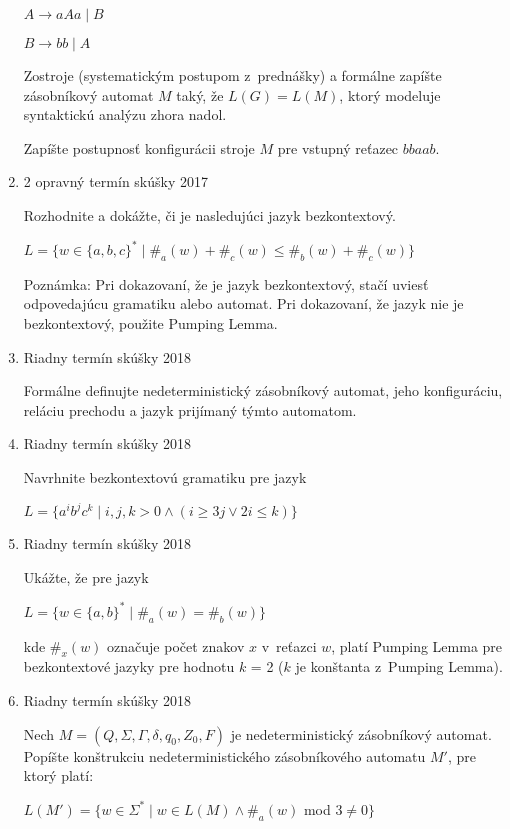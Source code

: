 \documentclass[]{article}
\begin{document}
\begin{enumerate}
		$A \rightarrow aAa \mid B$
		
		$B \rightarrow bb \mid A$
		
		Zostroje (systematickým postupom z~prednášky) a formálne zapíšte zásobníkový automat $M$ taký, že $L(G) = L(M)$, ktorý modeluje syntaktickú analýzu zhora nadol.
		
		Zapíšte postupnosť konfigurácii stroje $M$ pre vstupný reťazec $bbaab$.
		
		\item 2 opravný termín skúšky 2017
		
		Rozhodnite a dokážte, či je nasledujúci jazyk bezkontextový.
		
		$L = \{w \in \{a,b,c\}^* \mid \#_a(w) + \#_c(w) \leq  \#_b(w) +  \#_c(w)\}$
		
		Poznámka: Pri dokazovaní, že je jazyk bezkontextový, stačí uviesť odpovedajúcu gramatiku alebo automat. Pri dokazovaní, že jazyk nie je bezkontextový, použite Pumping Lemma.
		
		\item Riadny termín skúšky 2018
		
		Formálne definujte nedeterministický zásobníkový automat, jeho konfiguráciu, reláciu prechodu a jazyk prijímaný týmto automatom.
		
		\item Riadny termín skúšky 2018
		
		Navrhnite bezkontextovú gramatiku pre jazyk
		
		$L = \{a^ib^jc^k \mid i,j,k > 0 \land (i \geq 3j \lor 2i \leq k)\}$
		
		\item Riadny termín skúšky 2018
		
		Ukážte, že pre jazyk
		
		$L = \{w \in \{a,b\}^* \mid \#_a(w) = \#_b(w)\}$
		
		kde $\#_x(w)$ označuje počet znakov $x$ v~reťazci $w$, platí Pumping Lemma pre bezkontextové jazyky pre hodnotu $k$ = 2 ($k$ je konštanta z~Pumping Lemma).
		
		\item Riadny termín skúšky 2018 
		
		Nech $M = (Q, \Sigma, \Gamma, \delta, q_0, Z_0, F)$ je nedeterministický zásobníkový automat. Popíšte konštrukciu nedeterministického zásobníkového automatu $M'$, pre ktorý platí:
		
		$L(M') = \{w \in \Sigma^* \mid w \in L(M) \land \#_a(w)$ mod $3 \neq 0\}$
		
	\end{enumerate}
\end{document}
